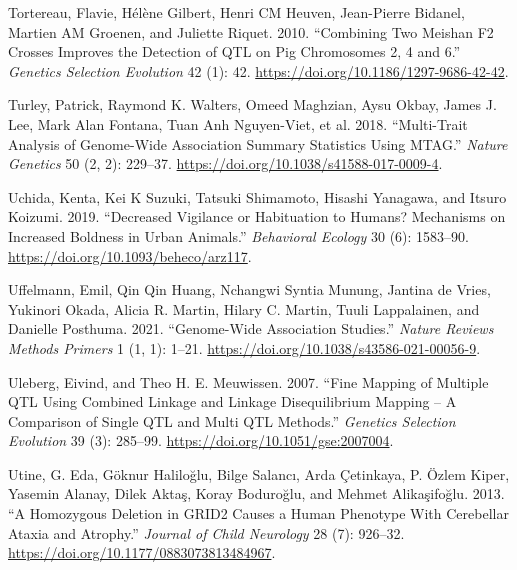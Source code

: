 \documentclass[
]{book}
\newlength{\cslhangindent}
\newlength{\cslentryspacingunit} %
\newenvironment{CSLReferences}[2] %
 {%
  \setlength{\parindent}{0pt}
  \ifodd #1
  \let\oldpar\par
  \def\par{\hangindent=\cslhangindent\oldpar}
  \fi
  \setlength{\parskip}{#2\cslentryspacingunit}
 }%
 {}
\begin{document}
\begin{CSLReferences}{1}{0}
\leavevmode{}%
Tortereau, Flavie, Hélène Gilbert, Henri CM Heuven, Jean-Pierre Bidanel, Martien AM Groenen, and Juliette Riquet. 2010. {``Combining Two {Meishan F2} Crosses Improves the Detection of {QTL} on Pig Chromosomes 2, 4 and 6.''} \emph{Genetics Selection Evolution} 42 (1): 42. \url{https://doi.org/10.1186/1297-9686-42-42}.

\leavevmode{}%
Turley, Patrick, Raymond K. Walters, Omeed Maghzian, Aysu Okbay, James J. Lee, Mark Alan Fontana, Tuan Anh Nguyen-Viet, et al. 2018. {``Multi-Trait Analysis of Genome-Wide Association Summary Statistics Using {MTAG}.''} \emph{Nature Genetics} 50 (2, 2): 229--37. \url{https://doi.org/10.1038/s41588-017-0009-4}.

\leavevmode{}%
Uchida, Kenta, Kei K Suzuki, Tatsuki Shimamoto, Hisashi Yanagawa, and Itsuro Koizumi. 2019. {``Decreased Vigilance or Habituation to Humans? {Mechanisms} on Increased Boldness in Urban Animals.''} \emph{Behavioral Ecology} 30 (6): 1583--90. \url{https://doi.org/10.1093/beheco/arz117}.

\leavevmode{}%
Uffelmann, Emil, Qin Qin Huang, Nchangwi Syntia Munung, Jantina de Vries, Yukinori Okada, Alicia R. Martin, Hilary C. Martin, Tuuli Lappalainen, and Danielle Posthuma. 2021. {``Genome-Wide Association Studies.''} \emph{Nature Reviews Methods Primers} 1 (1, 1): 1--21. \url{https://doi.org/10.1038/s43586-021-00056-9}.

\leavevmode{}%
Uleberg, Eivind, and Theo H. E. Meuwissen. 2007. {``Fine Mapping of Multiple {QTL} Using Combined Linkage and Linkage Disequilibrium Mapping -- {A} Comparison of Single {QTL} and Multi {QTL} Methods.''} \emph{Genetics Selection Evolution} 39 (3): 285--99. \url{https://doi.org/10.1051/gse:2007004}.

\leavevmode{}%
Utine, G. Eda, Göknur Haliloğlu, Bilge Salancı, Arda Çetinkaya, P. Özlem Kiper, Yasemin Alanay, Dilek Aktaş, Koray Boduroğlu, and Mehmet Alikaşifoğlu. 2013. {``A {Homozygous Deletion} in {GRID2 Causes} a {Human Phenotype With Cerebellar Ataxia} and {Atrophy}.''} \emph{Journal of Child Neurology} 28 (7): 926--32. \url{https://doi.org/10.1177/0883073813484967}.


\end{CSLReferences}
\end{document}
